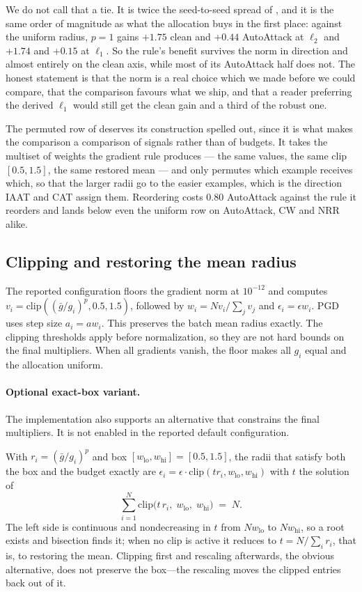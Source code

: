 We do not call that a tie. It is twice the seed-to-seed spread of , and it is the same
order of magnitude as what the allocation buys in the first place: against the uniform radius, $p = 1$
gains $+1.75$ clean and $+0.44$ AutoAttack at $\ell_2$ and $+1.74$ and $+0.15$ at $\ell_1$. So the
rule's benefit survives the norm in direction and almost entirely on the clean axis, while most of its
AutoAttack half does not. The honest statement is that the norm is a real choice which we made before
we could compare, that the comparison favours what we ship, and that a reader preferring the derived
$\ell_1$ would still get the clean gain and a third of the robust one.

The permuted row of  deserves its construction spelled out, since it is what makes
the comparison a comparison of signals rather than of budgets. It takes the multiset of weights the
gradient rule produces --- the same values, the same clip $[0.5, 1.5]$, the same restored mean --- and
only permutes which example receives which, so that the larger radii go to the easier examples, which
is the direction IAAT and CAT assign them. Reordering costs $0.80$ AutoAttack against the rule it
reorders and lands below even the uniform row on AutoAttack, CW and NRR alike.

\subsection{Clipping and restoring the mean radius}

The reported configuration floors the gradient norm at $10^{-12}$ and computes
$v_i=\mathrm{clip}((\bar g/g_i)^p,0.5,1.5)$, followed by
$w_i=Nv_i/\sum_jv_j$ and $\epsilon_i=\epsilon w_i$. PGD uses step size $a_i=aw_i$.
This preserves the batch mean radius exactly. The clipping thresholds apply before normalization,
so they are not hard bounds on the final multipliers. When all gradients vanish, the floor makes all
$g_i$ equal and the allocation uniform.

\paragraph{Optional exact-box variant.}
The implementation also supports an alternative that constrains the final multipliers. It is not
enabled in the reported default configuration.

With $r_i = (\bar g / g_i)^p$ and box $[w_{\mathrm{lo}}, w_{\mathrm{hi}}] = [0.5, 1.5]$, the radii that
satisfy both the box and the budget exactly are $\epsilon_i = \epsilon \cdot \mathrm{clip}(t r_i,
w_{\mathrm{lo}}, w_{\mathrm{hi}})$ with $t$ the solution of
\begin{equation}
\sum_{i=1}^{N} \mathrm{clip}\big(t\, r_i,\; w_{\mathrm{lo}},\; w_{\mathrm{hi}}\big) \;=\; N .
\label{eqn:box}
\end{equation}
The left side is continuous and nondecreasing in $t$ from $N w_{\mathrm{lo}}$ to $N w_{\mathrm{hi}}$,
so a root exists and bisection finds it; when no clip is active it reduces to $t = N / \sum_i r_i$,
that is, to restoring the mean. Clipping first and rescaling afterwards, the obvious alternative, does
not preserve the box---the rescaling moves the clipped entries back out of it.


